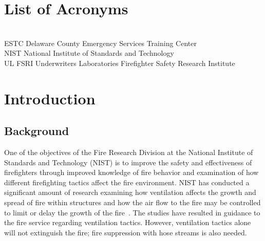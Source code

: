 \documentclass[12pt,oneside]{book}
\begin{document}
\cleardoublepage
{}
{}
\tableofcontents

\cleardoublepage
{}
{}
\listoffigures

\cleardoublepage
{}
{}
\listoftables

\chapter{List of Acronyms}

\begin{tabbing}
\hspace{1.5in} \= \\
ESTC \> Delaware County Emergency Services Training Center \\
NIST \> National Institute of Standards and Technology \\
UL FSRI \> Underwriters Laboratories Firefighter Safety Research Institute
\end{tabbing}

\newpage


\mainmatter


\chapter{Introduction}
\label{chap:intro}
\section{Background}
\label{sec:background}
One of the objectives of the Fire Research Division at the National Institute of Standards and Technology (NIST) is to improve the safety and effectiveness of firefighters through improved knowledge of fire behavior and examination of how different firefighting tactics affect the fire environment. NIST has conducted a significant amount of research examining how ventilation affects the growth and spread of fire within structures and how the air flow to the fire may be controlled to limit or delay the growth of the fire~\cite{madrzykowski2009fire,kerber2009fire}. The studies have resulted in guidance to the fire service regarding ventilation tactics. However, ventilation tactics alone will not extinguish the fire; fire suppression with hose streams is also needed.
\end{document}
